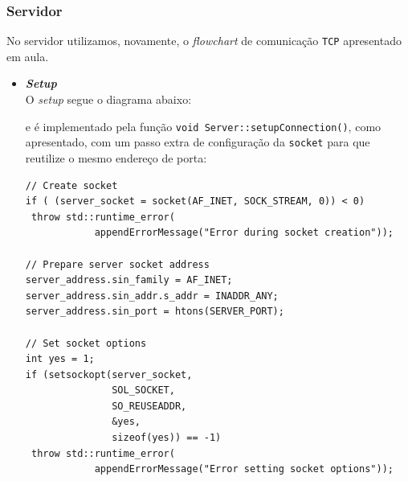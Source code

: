 \documentclass{article}
\begin{document}
\subsubsection{Servidor}
No servidor utilizamos, novamente, o \textit{flowchart} de comunicação \texttt{TCP} apresentado em aula. 
\\
\begin{itemize}
    \item \textit{\textbf{Setup}}\\
O \textit{setup} segue o diagrama abaixo:
\\
\begin{center}
\end{center}%
e é implementado pela função \texttt{void Server::setupConnection()}, como apresentado, com um passo extra de configuração da \texttt{socket} para que reutilize o mesmo endereço de porta:
\\
\begin{lstlisting}[xleftmargin=-.1\textwidth, xrightmargin=-.1\textwidth]
// Create socket
if ( (server_socket = socket(AF_INET, SOCK_STREAM, 0)) < 0)
 throw std::runtime_error(
            appendErrorMessage("Error during socket creation"));

// Prepare server socket address
server_address.sin_family = AF_INET;
server_address.sin_addr.s_addr = INADDR_ANY;
server_address.sin_port = htons(SERVER_PORT);

// Set socket options
int yes = 1;
if (setsockopt(server_socket, 
               SOL_SOCKET, 
               SO_REUSEADDR, 
               &yes, 
               sizeof(yes)) == -1)
 throw std::runtime_error(
            appendErrorMessage("Error setting socket options"));


\end{lstlisting}
\end{itemize}
\end{document}
